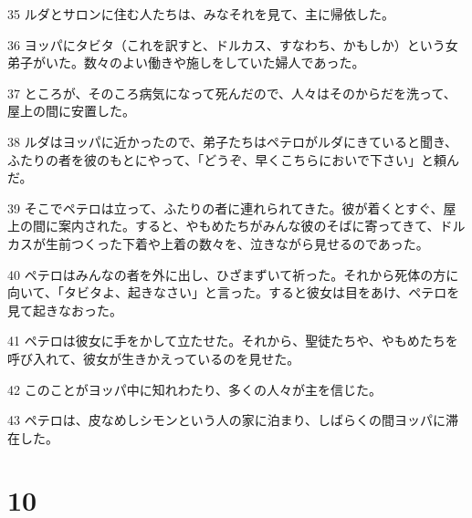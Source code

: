 \par 35 ルダとサロンに住む人たちは、みなそれを見て、主に帰依した。
\par 36 ヨッパにタビタ（これを訳すと、ドルカス、すなわち、かもしか）という女弟子がいた。数々のよい働きや施しをしていた婦人であった。
\par 37 ところが、そのころ病気になって死んだので、人々はそのからだを洗って、屋上の間に安置した。
\par 38 ルダはヨッパに近かったので、弟子たちはペテロがルダにきていると聞き、ふたりの者を彼のもとにやって、「どうぞ、早くこちらにおいで下さい」と頼んだ。
\par 39 そこでペテロは立って、ふたりの者に連れられてきた。彼が着くとすぐ、屋上の間に案内された。すると、やもめたちがみんな彼のそばに寄ってきて、ドルカスが生前つくった下着や上着の数々を、泣きながら見せるのであった。
\par 40 ペテロはみんなの者を外に出し、ひざまずいて祈った。それから死体の方に向いて、「タビタよ、起きなさい」と言った。すると彼女は目をあけ、ペテロを見て起きなおった。
\par 41 ペテロは彼女に手をかして立たせた。それから、聖徒たちや、やもめたちを呼び入れて、彼女が生きかえっているのを見せた。
\par 42 このことがヨッパ中に知れわたり、多くの人々が主を信じた。
\par 43 ペテロは、皮なめしシモンという人の家に泊まり、しばらくの間ヨッパに滞在した。

\chapter{10}

